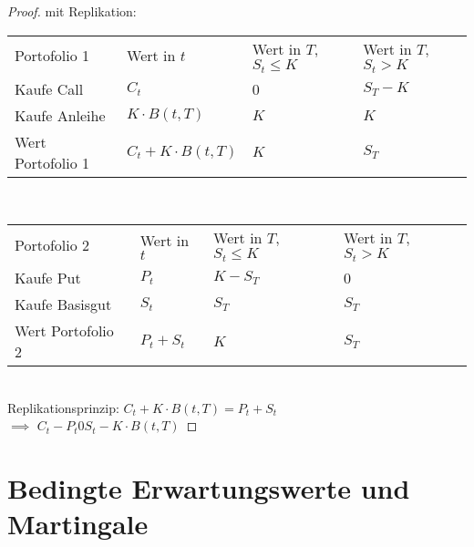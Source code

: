 \begin{proof} %
	mit Replikation:\\
	\begin{tabular}{l|l|l|l} %
		Portofolio 1 & Wert in $t$ & Wert in $T$, $S_t \le K$ & Wert in $T$, $S_t > K$\\
		Kaufe Call & $C_t$ & 0 & $S_T - K$\\
		Kaufe Anleihe & $K \cdot B(t,T)$ & $K$ & $K$\\
		Wert Portofolio 1 & $C_t + K\cdot B(t,T)$ & $K$ & $S_T$\\
	\end{tabular}\\
	\newline
	\begin{tabular}{l|l|l|l} %
		Portofolio 2 & Wert in $t$ & Wert in $T$, $S_t \le K$ & Wert in $T$, $S_t > K$\\
		Kaufe Put & $P_t$ & $K-S_T$ & 0\\
		Kaufe Basisgut & $S_t$ & $S_T$ & $S_T$\\
		Wert Portofolio 2 & $P_t + S_t$ & $K$ & $S_T$\\
	\end{tabular}\\
	Replikationsprinzip: $C_t + K\cdot B(t,T) = P_t + S_t$\\
	$\implies$ $C_t - P_t 0 S_t - K\cdot B(t,T)$
\end{proof} %
\section{Bedingte Erwartungswerte und Martingale} %
